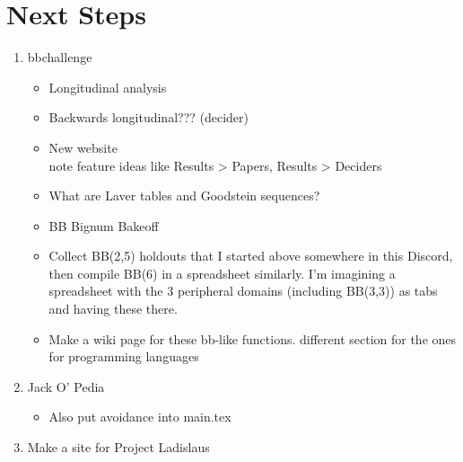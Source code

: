 \documentclass[a4paper]{article}
\theoremstyle{plain}
\theoremstyle{definition}
\theoremstyle{remark}
\begin{document}
\section{Next Steps}
\begin{enumerate}
    \item bbchallenge
    \begin{itemize}
        \item Longitudinal analysis
\item Backwards longitudinal??? (decider)
\item New website
\\note feature ideas like Results > Papers, Results > Deciders
\item What are Laver tables and Goodstein sequences?
\item BB Bignum Bakeoff
\item Collect BB(2,5) holdouts that I started above somewhere in this Discord, then compile BB(6) in a spreadsheet similarly. I’m imagining a spreadsheet with the 3 peripheral domains (including BB(3,3)) as tabs and having these there.
\item Make a wiki page for these bb-like functions. different section for the ones for programming languages
    \end{itemize}
    \item Jack O' Pedia
    \begin{itemize}
        \item Also put avoidance into main.tex
    \end{itemize}
    \item Make a site for Project Ladislaus
\end{enumerate}
\end{document}
